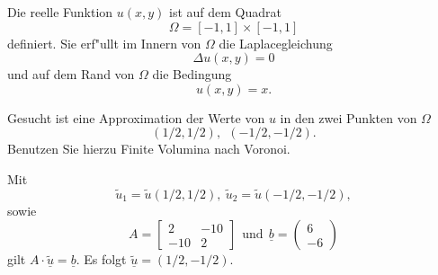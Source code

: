 Die reelle Funktion $u(x,y)$ ist auf dem Quadrat
\[
\Omega = [-1, 1] \times [-1,1]
\]
definiert. Sie erf"ullt im Innern von $\Omega$ die Laplacegleichung
\[
\Delta u(x,y) = 0
\]
und auf dem Rand von $\Omega$ die Bedingung
\[
u(x,y) = x.
\]

Gesucht ist eine Approximation der Werte von $u$ in den zwei Punkten
von $\Omega$
\[
(1/2,1/2), \ \    (-1/2,-1/2).
\]
Benutzen Sie hierzu Finite Volumina nach Voronoi.  

\begin{loesung}
Mit 
\[
\tilde u_1 = \tilde u(1/2,1/2), \ \tilde u_2 = \tilde u(-1/2,-1/2),
\]
sowie 
\[
A = \left[\begin{array}{rr} 
2 & -10   \\
 -10 & 2 \end{array}\right] \ \ \text{und} \ \
\underline{b} =  \left(\begin{array}{r} 6 \\ -6 \end{array}\right)
\]
gilt $A \cdot \underline{\tilde u} = \underline{b}.$
Es folgt $\underline{\tilde u} = (1/2, -1/2).$
\end{loesung}

